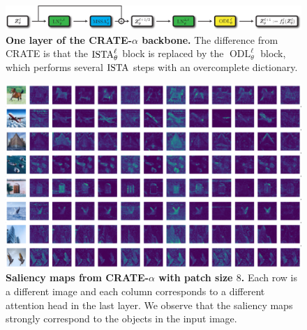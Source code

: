 \documentclass[../../book-main.tex]{subfiles}
\begin{document}
\begin{figure}
    \centering 
    \includegraphics[width=\textwidth]{figs_chap7/crate_alpha_backbone.pdf}
    \caption{\small\textbf{One layer of the CRATE-\(\alpha\) backbone.} The difference from CRATE is that the \(\operatorname{ISTA}_{\theta}^{\ell}\) block is replaced by the \(\operatorname{ODL}_{\theta}^{\ell}\) block, which performs several \(\operatorname{ISTA}\) steps with an overcomplete dictionary.}
    \label{fig:crate_alpha_backbone}
\end{figure}

\begin{figure}
    \centering 
    \includegraphics[width=\textwidth]{figs_chap7/crate_alpha_semantic_heads.pdf}
    \caption{\small\textbf{Saliency maps from CRATE-\(\alpha\) with patch size \(8\).} Each row is a different image and each column corresponds to a different attention head in the last layer. We observe that the saliency maps strongly correspond to the objects in the input image.}
    \label{fig:crate_alpha_saliency_maps}
\end{figure}
\end{document}
